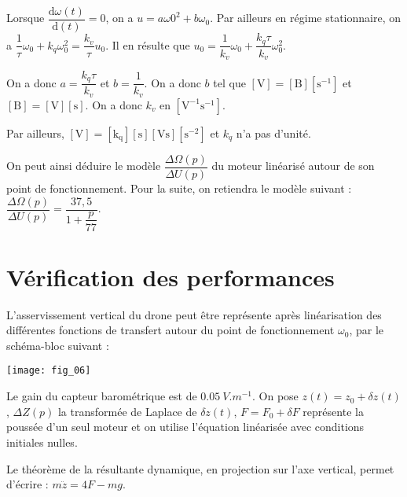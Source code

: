 \ifprof
\begin{corrige}
Lorsque $\dfrac{\text{d}\omega(t)}{\text{d}(t)}=0$, on a  $u=a\omega0^2+b\omega_0$. Par ailleurs en régime stationnaire, on a $\dfrac{1}{\tau}\omega_0 +k_q\omega_0^2 = \dfrac{k_v}{\tau}u_0$. Il en résulte que 
$u_0 = \dfrac{1}{k_v}\omega_0 +\dfrac{k_q\tau}{k_v} \omega_0^2$.

On a donc $a=\dfrac{k_q\tau}{k_v}$ et  $b=\dfrac{1}{k_v}$. On a donc $b$ tel que $[\text{V}]=[\text{B}][\text{s}^{-1}]$ et $[\text{B}]=[\text{V}][\text{s}]$. On a donc $k_v$ en $[\text{V}^{-1}\text{s}^{-1}]$.

Par ailleurs, $[\text{V}]=[\text{k}_{\text{q}}][\text{s}][\text{Vs}][\text{s}^{-2}]$  et $k_q$ n'a pas d'unité. 

\end{corrige}
\else
\fi

On peut ainsi déduire le modèle $\dfrac{\Delta \Omega(p)}{\Delta U(p)}$ du moteur linéarisé autour de son point de fonctionnement. Pour la suite, on retiendra le modèle suivant : $\dfrac{\Delta \Omega(p)}{\Delta U(p)}=\dfrac{37,5}{1+\dfrac{p}{77}}$.

\section*{Vérification des performances}

\ifprof
\else
L'asservissement vertical du drone peut être représente après linéarisation des différentes fonctions de
transfert autour du point de fonctionnement $\omega_0$, par le schéma-bloc suivant :

\begin{center}
\texttt{[image: fig\_06]}
\end{center}



Le gain du capteur barométrique est de $\SI{0,05}{V.m^{-1}}$. On pose $z(t)=z_0+\delta z(t)$, $\Delta Z(p)$ la transformée de Laplace de $\delta z(t)$, $F=F_0 + \delta F$ représente la poussée d'un seul moteur et on utilise l'équation linéarisée avec conditions initiales nulles.

Le théorème de la résultante dynamique, en projection sur l’axe vertical, permet d’écrire :
$ m\ddot{z} =4F-mg. $
\fi



